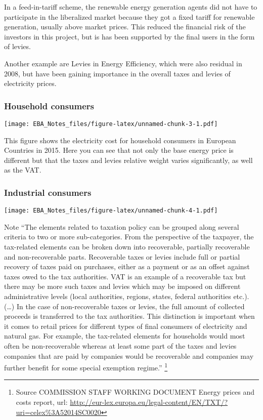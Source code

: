 \documentclass[]{book}
\let\rmarkdownfootnote\footnote%
\def\footnote{\protect\rmarkdownfootnote}
\theoremstyle{definition}
\theoremstyle{definition}
\theoremstyle{definition}
\theoremstyle{remark}
\begin{document}
In a feed-in-tariff scheme, the renewable energy generation agents did
not have to participate in the liberalized market because they got a
fixed tariff for renewable generation, usually above market prices. This
reduced the financial risk of the investors in this project, but is has
been supported by the final users in the form of levies.

Another example are Levies in Energy Efficiency, which were also
residual in 2008, but have been gaining importance in the overall taxes
and levies of electricity prices.

\subsubsection{Household consumers}\label{household-consumers}

\texttt{[image: EBA\_Notes\_files/figure-latex/unnamed-chunk-3-1.pdf]}

This figure shows the electricity cost for household consumers in
European Countries in 2015. Here you can see that not only the base
energy price is different but that the taxes and levies relative weight
varies significantly, as well as the VAT.

\subsubsection{Industrial consumers}\label{industrial-consumers}

\texttt{[image: EBA\_Notes\_files/figure-latex/unnamed-chunk-4-1.pdf]}

Note ``The elements related to taxation policy can be grouped along
several criteria to two or more sub-categories. From the perspective of
the taxpayer, the tax-related elements can be broken down into
recoverable, partially recoverable and non-recoverable parts.
Recoverable taxes or levies include full or partial recovery of taxes
paid on purchases, either as a payment or as an offset against taxes
owed to the tax authorities. VAT is an example of a recoverable tax but
there may be more such taxes and levies which may be imposed on
different administrative levels (local authorities, regions, states,
federal authorities etc.). (\ldots{}) In the case of non-recoverable
taxes or levies, the full amount of collected proceeds is transferred to
the tax authorities. This distinction is important when it comes to
retail prices for different types of final consumers of electricity and
natural gas. For example, the tax-related elements for households would
most often be non-recoverable whereas at least some part of the taxes
and levies companies that are paid by companies would be recoverable and
companies may further benefit for some special exemption regime.''
\footnote{Source COMMISSION STAFF WORKING DOCUMENT Energy prices and
  costs report, url:
  \url{http://eur-lex.europa.eu/legal-content/EN/TXT/?uri=celex\%3A52014SC0020}}
\end{document}
